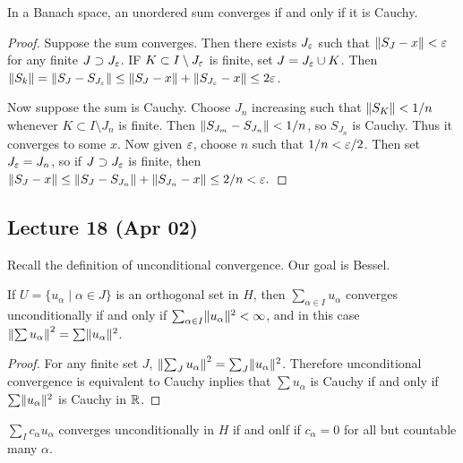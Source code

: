 \documentclass[10pt, twoside]{article}
\begin{document}
    \begin{lem} In a Banach space, an unordered sum converges if and only if it
        is Cauchy.  \begin{proof} Suppose the sum converges. Then there exists
            $J_{\ep}$ such that $\norm{S_J - x} < \ep$ for any finite $J
            \supset J_{\ep}$. IF $K \subset I \setminus J_{\ep}$ is finite, set
            $J = J_{\ep} \cup K$. Then $\norm{S_k} = \norm{S_J - S_{J_{\ep}}}
            \leq \norm{S_J - x} + \norm{S_{J_{\ep}} - x} \leq 2 \ep$.

            Now suppose the sum is Cauchy. Choose $J_n$ increasing such that
        $\norm{S_K} < 1/n$ whenever $K \subset I \setminus J_n$ is finite. Then
    $\norm{S_{J_m} - S_{J_n}} < 1/n$, so $S_{J_n}$ is Cauchy. Thus it converges
to some $x$. Now given $\ep$, choose $n$ such that $1/n < \ep/2$. Then set
$J_{\ep} = J_n$, so if $J \supset J_{\ep}$ is finite, then $\norm{S_J - x} \leq
\norm{S_J - S_{J_n}} + \norm{S_{J_n} - x} \leq 2/n < \ep.$ \end{proof}
\end{lem}

    \subsection{Lecture 18 (Apr 02)} Recall the definition of unconditional
    convergence. Our goal is Bessel.

    \begin{lem} If $U = \{u_{\alpha} \mid \alpha \in J \}$ is an orthogonal set
        in $H$, then $\sum_{\alpha \in I} u_{\alpha}$ converges unconditionally
        if and only if $\sum_{\alpha \in I} \norm{u_{\alpha}}^2 < \infty$, and
        in this case $\norm*{\sum u_{\alpha}}^2 = \sum \norm{u_{\alpha}}^2$.
        \begin{proof} For any finite set $J$, $\norm*{\sum_J u_{\alpha}}^2 =
            \sum_J \norm{u_{\alpha}}^2$. Therefore unconditional convergence is
            equivalent to Cauchy inplies that $\sum u_{\alpha}$ is Cauchy if
            and only if $\sum \norm{u_{\alpha}}^2$ is Cauchy in $\R$.
        \end{proof} \end{lem}

    \begin{cor} $\sum_I c_{\alpha} u_{\alpha}$ converges unconditionally in $H$
    if and onlf if $c_{\alpha}=0$ for all but countable many $\alpha$.
\end{cor}
\end{document}
